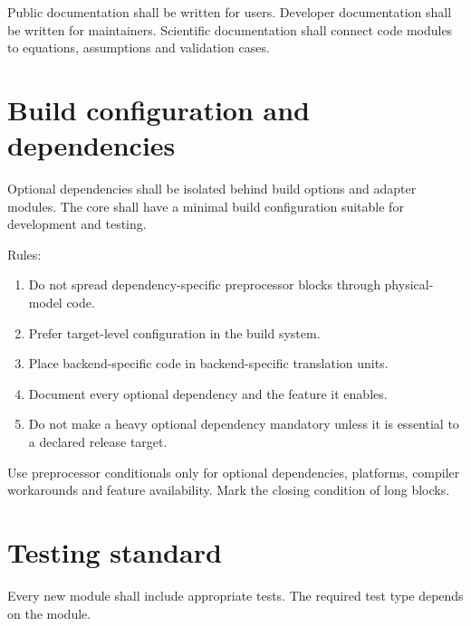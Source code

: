 \documentclass[11pt,a4paper]{article}
\begin{document}
Public documentation shall be written for users. Developer documentation shall be written for maintainers. Scientific documentation shall connect code modules to equations, assumptions and validation cases.

\section{Build configuration and dependencies}

Optional dependencies shall be isolated behind build options and adapter modules. The core shall have a minimal build configuration suitable for development and testing.

Rules:

\begin{enumerate}
  \item Do not spread dependency-specific preprocessor blocks through physical-model code.
  \item Prefer target-level configuration in the build system.
  \item Place backend-specific code in backend-specific translation units.
  \item Document every optional dependency and the feature it enables.
  \item Do not make a heavy optional dependency mandatory unless it is essential to a declared release target.
\end{enumerate}

Use preprocessor conditionals only for optional dependencies, platforms, compiler workarounds and feature availability. Mark the closing condition of long blocks.

\section{Testing standard}

Every new module shall include appropriate tests. The required test type depends on the module.
\end{document}
